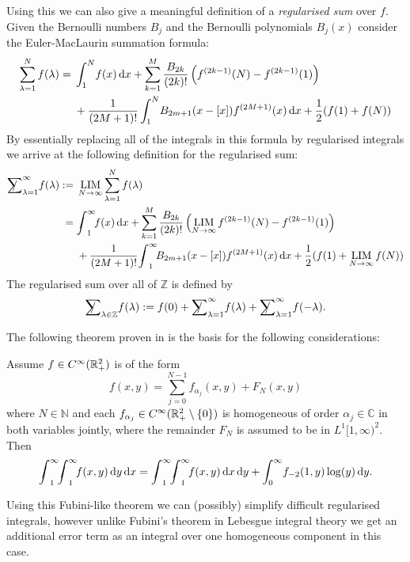 Using this we can also give a meaningful definition of a \emph{regularised sum}
over $f$. Given the Bernoulli numbers $B_j$ and the Bernoulli polynomials
$B_j(x)$ consider the Euler-MacLaurin summation formula:
\begin{equation}
  \label{eqn:euler-maclaurin}
  \begin{split}
    \sum_{\lambda=1}^N f(\lambda) = {} & \Integ[N]{1}{x}{f(x)}
    + \sum_{k=1}^M \frac{B_{2k}}{(2k)!}\left(f^{(2k-1)}(N) - f^{(2k-1)}(1)\right)
    \\
    &+ \frac1{(2M + 1)!}\Integ[N]{1}{x}{B_{2m+1}(x-[x])f^{(2M+1)}(x)}
    + \frac12(f(1)+f(N))
  \end{split}
\end{equation}
By essentially replacing all of the integrals in this formula by regularised
integrals we arrive at the following definition for the regularised sum:
\begin{align*}
  \Regsum_{\lambda=1}^\infty f(\lambda) := {}& \Reglim_{N\to\infty}
  \sum_{\lambda=1}^N f(\lambda) \\
  = {} & \Regint{x}{f(x)} + \sum_{k=1}^M \frac{B_{2k}}{(2k)!}\left(
  \Reglim_{N\to\infty} f^{(2k-1)}(N) - f^{(2k-1)}(1)\right) \\
  &+ \frac1{(2M + 1)!}\Regint{x}{B_{2m+1}(x - [x])f^{(2M+1)}(x)}
   + \frac12(f(1) + \Reglim_{N\to\infty} f(N))
\end{align*}
The regularised sum over all of $\mathbb{Z}$ is defined by
\begin{equation*}
  \Regsum_{\lambda\in\mathbb{Z}} f(\lambda) := f(0) + \Regsum_{\lambda=1}^\infty
  f(\lambda) + \Regsum_{\lambda=1}^\infty f(-\lambda).
\end{equation*}

The following theorem proven in \cite{LV13} is the basis for the following
considerations:
\begin{Theorem}
  \label{thm:fubini}
  Assume $f\in\Cinf(\Rplus[2])$ is of the form
  \begin{equation*}
    f(x,y) = \sum_{j=0}^{N-1} f_{\alpha_j}(x,y) + F_N(x,y)
  \end{equation*}
  where $N\in\mathbb{N}$ and each $f_{\alpha_j}\in\Cinf(\mathbb{R}_+^2\setminus\{0\})$
  is homogeneous of order $\alpha_j\in\mathbb{C}$ in both variables jointly,
  where the remainder $F_N$ is assumed to be in $L^1[1,\infty)^2$. Then
  \begin{equation*}
    \Regint{x}{\Regint{y}{f(x,y)}} =
    \Regint{y}{\Regint{x}{f(x,y)}} + \Integ[\infty]{0}{y}{f_{-2}(1,y)\log(y)}.
  \end{equation*}
\end{Theorem}
Using this Fubini-like theorem we can (possibly) simplify difficult regularised
integrals, however unlike Fubini's theorem in Lebesgue integral theory we get an
additional error term as an integral over one homogeneous component in this
case.

